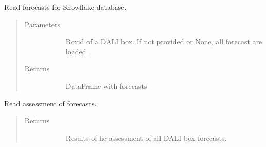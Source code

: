 \documentclass[letterpaper,10pt,english]{sphinxmanual}
\begin{document}
\begin{fulllineitems}
\label{\detokenize{autoapi/src/utils/snowflake/index:src.utils.snowflake.read_forecasts}}
Read forecasts for Snowflake database.
\begin{quote}\begin{description}
\item[{Parameters}] \leavevmode\begin{description}
\item[{}] \leavevmode
Boxid of a DALI box. If not provided or None, all forecast are loaded.

\end{description}

\item[{Returns}] \leavevmode\begin{description}
\item[{}] \leavevmode
DataFrame with forecasts.

\end{description}

\end{description}\end{quote}

\end{fulllineitems}


\begin{fulllineitems}
\label{\detokenize{autoapi/src/utils/snowflake/index:src.utils.snowflake.read_forecast_meta}}
Read assessment of forecasts.
\begin{quote}\begin{description}
\item[{Returns}] \leavevmode\begin{description}
\item[{}] \leavevmode
Results of he assessment of all DALI box forecasts.

\end{description}

\end{description}\end{quote}

\end{fulllineitems}
\end{document}
